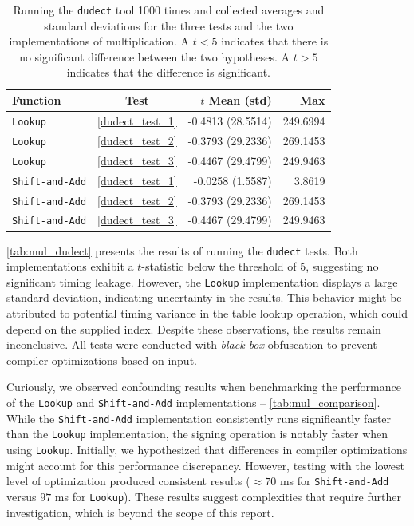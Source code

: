 \documentclass[11pt]{report}
\theoremstyle{definition}
\theoremstyle{plain}
\begin{document}
\begin{table}[H]
  \centering
  \begin{tabular}{|l|c|r|r|}
    \hline
    \textbf{Function}      & \textbf{Test}       & \textbf{$t$ Mean (std)} & \textbf{Max} \\ \hline
    \texttt{Lookup}        & \ref{dudect_test_1} & -0.4813 (28.5514)       & 249.6994     \\
    \texttt{Lookup}        & \ref{dudect_test_2} & -0.3793 (29.2336)       & 269.1453     \\
    \texttt{Lookup}        & \ref{dudect_test_3} & -0.4467 (29.4799)       & 249.9463     \\
    \texttt{Shift-and-Add} & \ref{dudect_test_1} & -0.0258 (1.5587)        & 3.8619       \\
    \texttt{Shift-and-Add} & \ref{dudect_test_2} & -0.3793 (29.2336)       & 269.1453     \\
    \texttt{Shift-and-Add} & \ref{dudect_test_3} & -0.4467 (29.4799)       & 249.9463     \\\hline
  \end{tabular}
  \caption{Running the \texttt{dudect} tool 1000 times and collected averages and standard deviations for the three tests and the two implementations of multiplication. A $t < 5$ indicates that there is no significant difference between the two hypotheses. A $t > 5$ indicates that the difference is significant.}
  \label{tab:mul_dudect}
\end{table}

\autoref{tab:mul_dudect} presents the results of running the \texttt{dudect} tests. Both implementations exhibit a $t$-statistic below the threshold of 5, suggesting no significant timing leakage. However, the \texttt{Lookup} implementation displays a large standard deviation, indicating uncertainty in the results. This behavior might be attributed to potential timing variance in the table lookup operation, which could depend on the supplied index. Despite these observations, the results remain inconclusive. All tests were conducted with \textit{black box} obfuscation to prevent compiler optimizations based on input. 

Curiously, we observed confounding results when benchmarking the performance of the \texttt{Lookup} and \texttt{Shift-and-Add} implementations -- \autoref{tab:mul_comparison}. While the \texttt{Shift-and-Add} implementation consistently runs significantly faster than the \texttt{Lookup} implementation, the signing operation is notably faster when using \texttt{Lookup}. Initially, we hypothesized that differences in compiler optimizations might account for this performance discrepancy. However, testing with the lowest level of optimization produced consistent results ($\approx 70$ ms for \texttt{Shift-and-Add} versus $97$ ms for \texttt{Lookup}). These results suggest complexities that require further investigation, which is beyond the scope of this report.
\end{document}
